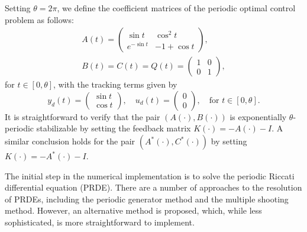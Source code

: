 \documentclass{IEEEtran}
\begin{document}
	Setting $\theta=2\pi$, we define the coefficient matrices of the periodic optimal control problem as follows:
	\begin{equation*}
		\begin{split}
			A(t)=
			\begin{pmatrix}
				\sin t & \cos^2 t\\
				e^{-\sin t} & -1+\cos t
			\end{pmatrix},\\
			B(t)=C(t)=Q(t)=
			\begin{pmatrix}
				1 & 0\\
				0 & 1
			\end{pmatrix},
		\end{split}
	\end{equation*}
	for $t\in[0,\theta]$, with the tracking terms given by
	\begin{equation*}
		y_d(t)= \begin{pmatrix} \sin t\\ \cos t \end{pmatrix},\quad
		u_d(t)= \begin{pmatrix} 0\\ 0 \end{pmatrix},\quad \text{for } t\in[0,\theta].
	\end{equation*}
	It is straightforward to verify that the pair $(A(\cdot),B(\cdot))$ is exponentially $\theta$-periodic stabilizable by setting the feedback matrix $K(\cdot)=-A(\cdot)-I$. A similar conclusion holds for the pair $(A^*(\cdot),C^*(\cdot))$ by setting $K(\cdot)=-A^*(\cdot)-I$.
	
	The initial step in the numerical implementation is to solve the periodic Riccati differential equation (PRDE). There are a number of approaches to the resolution of PRDEs, including the periodic generator method and the multiple shooting method. However, an alternative method is proposed, which, while less sophisticated, is more straightforward to implement. 
	
\end{document}
